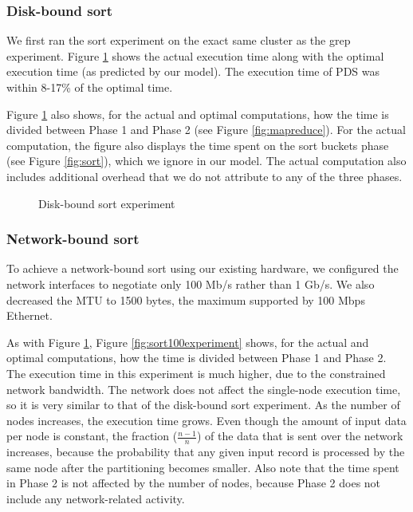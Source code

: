 \documentclass{acm_proc_article-sp}
\begin{document}
\subsubsection{Disk-bound sort}

We first ran the sort experiment on the exact same cluster as the grep
experiment. Figure \ref{fig:sort1000experiment} shows the actual execution time along with the optimal
execution time (as predicted by our model). The execution time of PDS was
within 8-17\% of the optimal time.

Figure \ref{fig:sort1000experiment} also shows, for the actual and optimal
computations, how the time is divided between Phase 1 and Phase 2 (see Figure \ref{fig:mapreduce}). For the actual computation, the
figure also displays the time spent on the sort buckets phase (see
Figure \ref{fig:sort}), which we ignore in our model. The actual computation
also includes additional overhead that we do not attribute to
any of the three phases.

\begin{figure}
\caption{Disk-bound sort experiment}
\label{fig:sort1000experiment}
\end{figure}

\subsubsection{Network-bound sort}

To achieve a network-bound sort using our existing hardware, we
configured the network interfaces to negotiate only 100 Mb/s rather than 1 Gb/s. We also decreased the
MTU to 1500 bytes, the maximum supported by 100 Mbps Ethernet.

As with Figure \ref{fig:sort1000experiment}, Figure \ref{fig:sort100experiment}
shows, for the actual and optimal computations, how the time is divided between Phase 1 and Phase 2. The execution time in this experiment is much higher, due to the
constrained network bandwidth. The network does not affect the single-node
execution time, so it is very similar to that of the disk-bound sort
experiment. As the number of nodes increases, the execution time
grows. Even though the amount of input data per node is constant, the fraction
($\frac{n-1}{n}$) of the data that is sent over the network increases, because
the probability that any given input record is processed by the same node after
the partitioning becomes smaller. Also note that the time spent in Phase 2 is
not affected by the number of nodes, because Phase 2 does not include any
network-related activity.
\end{document}

